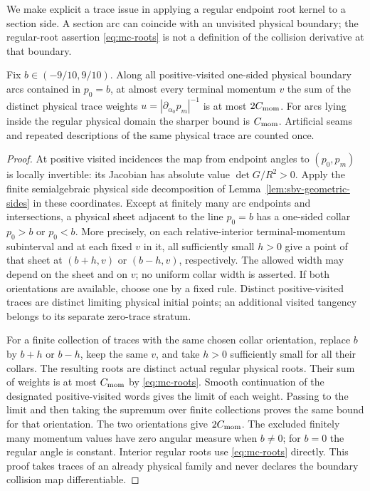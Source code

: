 We make explicit a trace issue in applying a regular endpoint root
kernel to a section side.  A section arc can coincide with an
unvisited physical boundary; the regular-root assertion
\eqref{eq:mc-roots} is not a definition of the collision derivative
at that boundary.

\begin{lemma}
\label{lem:es-trace-kernel}
Fix $b\in(-9/10,9/10)$.  Along all positive-visited one-sided
physical boundary arcs contained in $p_0=b$, at almost every
terminal momentum $v$ the sum of the distinct physical trace
weights $u=|\partial_{\alpha_0}p_m|^{-1}$ is at most
$2C_{\rm mom}$.  For arcs lying inside the regular physical
domain the sharper bound is $C_{\rm mom}$.  Artificial seams
and repeated descriptions of the same physical trace are counted
once.
\end{lemma}
\begin{proof}
At positive visited incidences the map from endpoint angles to
$(p_0,p_m)$ is locally invertible: its Jacobian has absolute value
$\det G/R^2>0$.  Apply the finite semialgebraic physical side
decomposition of Lemma~\ref{lem:sbv-geometric-sides} in these
coordinates.  Except at finitely many arc endpoints and
intersections, a physical sheet adjacent to the line $p_0=b$
has a one-sided collar $p_0>b$ or $p_0<b$.  More precisely, on
each relative-interior terminal-momentum subinterval and at each
fixed $v$ in it, all sufficiently small $h>0$ give a point of
that sheet at $(b+h,v)$ or $(b-h,v)$, respectively.  The allowed
width may depend on the sheet and on $v$; no uniform collar width
is asserted.  If both orientations are available,
choose one by a fixed rule.  Distinct positive-visited traces are
distinct limiting physical initial points; an additional visited
tangency belongs to its separate zero-trace stratum.

For a finite collection of traces with the same chosen collar
orientation, replace $b$ by $b+h$ or $b-h$, keep the same $v$,
and take $h>0$ sufficiently small for all their collars.  The
resulting roots are distinct actual regular physical roots.  Their
sum of weights is at most $C_{\rm mom}$ by
\eqref{eq:mc-roots}.  Smooth continuation of the designated
positive-visited words gives the limit of each weight.  Passing
to the limit and then taking the supremum over finite collections
proves the same bound for that orientation.  The two orientations
give $2C_{\rm mom}$.  The excluded finitely many momentum values
have zero angular measure when $b\ne0$; for $b=0$ the regular
angle is constant.  Interior regular roots use
\eqref{eq:mc-roots} directly.  This proof takes traces of an
already physical family and never declares the boundary collision
map differentiable.
\end{proof}


